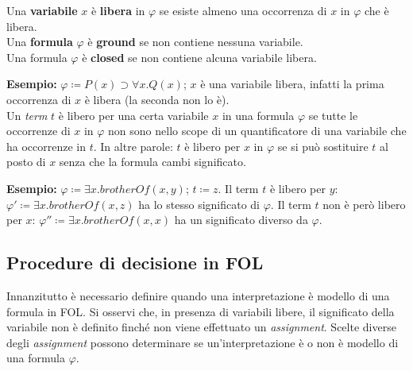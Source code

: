 Una \textbf{variabile} $x$ è \textbf{libera} in $\varphi$ se esiste almeno una occorrenza di $x$ in $\varphi$ che è libera.
\\

Una \textbf{formula} $\varphi$ è \textbf{ground} se non contiene nessuna variabile.
\\

Una formula $\varphi$ è \textbf{closed} se non contiene alcuna variabile libera.

\textbf{Esempio: } $\varphi \coloneqq P(x) \supset \forall x. Q(x)$; $x$ è una variabile libera, infatti la prima occorrenza di $x$ è libera (la seconda non lo è).
\\

Un \textit{term} $t$ è libero per una certa variabile $x$ in una formula $\varphi$ se tutte le occorrenze di $x$ in $\varphi$ non sono nello scope di un quantificatore di una variabile che ha occorrenze in $t$. In altre parole: $t$ è libero per $x$ in $\varphi$ se si può sostituire $t$ al posto di $x$ senza che la formula cambi significato.

\textbf{Esempio: } $\varphi \coloneqq \exists x. brotherOf(x, y)$; $t \coloneqq z$. Il term $t$ è libero per $y$: $\varphi' \coloneqq \exists x. brotherOf(x, z)$ ha lo stesso significato di $\varphi$. Il term $t$ non è però libero per $x$: $\varphi'' \coloneqq \exists x. brotherOf(x, x)$ ha un significato diverso da $\varphi$.

\subsection{Procedure di decisione in FOL}
Innanzitutto è necessario definire quando una interpretazione è modello di una formula in FOL. Si osservi che, in presenza di variabili libere, il significato della variabile non è definito finché non viene effettuato un \textit{assignment}. Scelte diverse degli \textit{assignment} possono determinare se un'interpretazione è o non è modello di una formula $\varphi$.

